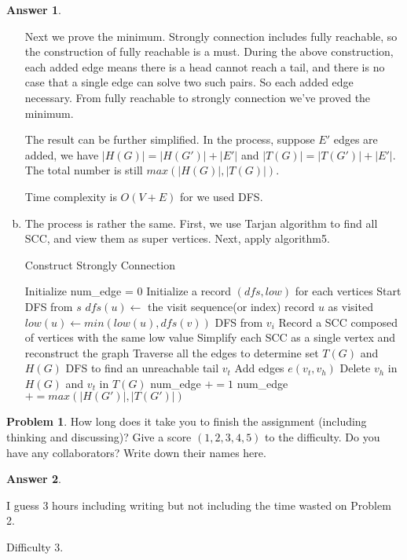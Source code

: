 \documentclass{article}
\theoremstyle{definition}
\newtheorem{prob}{Problem}
\newtheorem{ans}{Answer}
\begin{document}
\begin{ans}
\begin{enumerate}[(a)]
		Next we prove the minimum. Strongly connection includes fully reachable, so the construction of fully reachable is a must. During the above construction, each added edge means there is a head cannot reach a tail, and there is no case that a single edge can solve two such pairs. So each added edge necessary. From fully reachable to strongly connection we've proved the minimum.
		
		The result can be further simplified. In the process, suppose $E'$ edges are added, we have $|H(G)|=|H(G')|+|E'|$ and $|T(G)|=|T(G')|+|E'|$. The total number is still $max(|H(G)|,|T(G)|)$.
		
		Time complexity is $O(V+E)$ for we used DFS.
		
		\item The process is rather the same. First, we use Tarjan algorithm to find all SCC, and view them as super vertices. Next, apply algorithm5. 
	
		\begin{algorithm}
			\caption{Construct Strongly Connection}
			\BlankLine
			Initialize num\_edge = 0\;
			Initialize a record $(dfs,low)$ for each vertices\;
			Start DFS from $s$\;
			{
				$dfs(u)\gets$ the visit sequence(or index)\;
				record $u$ as visited\;
				{
					{$low(u)\gets min(low(u),dfs(v))$\;}
					{DFS from $v_i$\;}
					{Record a SCC composed of vertices with the same low value\;}
				}
			}
			Simplify each SCC as a single vertex and reconstruct the graph\;
			Traverse all the edges to determine set $T(G)$ and $H(G)$\;
			{
				DFS to find an unreachable tail $v_t$\;
				Add edges $e(v_t, v_h)$\;
				Delete $v_h$ in $H(G)$ and $v_t$ in $T(G)$\;
				num\_edge $+=1$\;
			}
			num\_edge $+=max(|H(G')|,|T(G')|)$
		\end{algorithm}

\end{enumerate}	
\end{ans}
\begin{prob}
	  How long does it take you to finish the assignment (including thinking and discussing)? Give a score $(1,2,3,4,5)$ to the difficulty. Do you have any collaborators? Write down their names here.
\end{prob}
\begin{ans}
	~
	
	I guess 3 hours including writing but not including the time wasted on Problem 2.
	
	Difficulty 3.
\end{ans}
\end{document}
